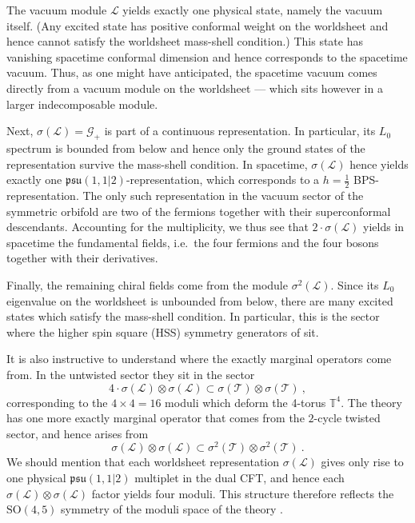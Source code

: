 \documentclass[12pt,a4paper]{article}
\newcommand{\be}{\begin{equation}}
\newcommand{\ee}{\end{equation}}
\begin{document}
The vacuum module $\mathscr{L}$ yields exactly one physical state, namely the vacuum itself. (Any excited state has positive conformal weight on the worldsheet and hence cannot satisfy the worldsheet mass-shell condition.) This state has vanishing spacetime conformal dimension and hence corresponds to the spacetime vacuum. Thus, as one might have anticipated, the spacetime vacuum comes directly from a vacuum module on the worldsheet --- which sits however in a larger indecomposable module. 

Next, $\sigma(\mathscr{L})=\mathscr{G}_+$ is part of a continuous representation. In particular, its $L_0$ spectrum is bounded from below and hence only the ground states of the representation survive the mass-shell condition. In spacetime, $\sigma(\mathscr{L})$ hence yields exactly one $\mathfrak{psu}(1,1|2)$-representation, which corresponds to a $h=\tfrac{1}{2}$ BPS-representation. The only such representation in the vacuum sector of the symmetric orbifold are two of the fermions together with their superconformal descendants. Accounting for the multiplicity, we thus see that $2 \cdot \sigma(\mathscr{L})$ yields in spacetime the fundamental fields, i.e.\ the four fermions and the four bosons together with their derivatives. 

Finally, the remaining chiral fields come from the module $\sigma^2(\mathscr{L})$. Since its $L_0$ eigenvalue on the worldsheet is unbounded from below, there are many excited states which satisfy the mass-shell condition. In particular, this is the sector where the higher spin square (HSS) symmetry generators of \cite{Gaberdiel:2014cha,Gaberdiel:2015mra} sit. 

It is also instructive to understand where the exactly marginal operators come from. In the untwisted sector they sit in the sector 
\be
4\cdot \sigma(\mathscr{L}) \otimes \sigma(\mathscr{L}) \subset \sigma(\mathscr{T}) \otimes \sigma(\mathscr{T}) \ , 
\ee
corresponding to the $4 \times 4=16$ moduli which deform the 4-torus $\mathbb{T}^4$. The theory has one more 
exactly marginal operator that comes from the $2$-cycle twisted sector, and hence arises from 
\be
\sigma(\mathscr{L}) \otimes \sigma(\mathscr{L}) \subset \sigma^2(\mathscr{T}) \otimes \sigma^2(\mathscr{T}) \ . 
\ee
We should mention that each worldsheet representation $\sigma(\mathscr{L})$ gives only rise to one physical $\mathfrak{psu}(1,1|2)$ multiplet in the dual CFT, and hence each $\sigma(\mathscr{L}) \otimes \sigma(\mathscr{L})$ factor yields four moduli. This structure therefore reflects the $\mathrm{SO}(4,5)$ symmetry of the moduli space of the theory \cite{Seiberg:1988pf}.
\end{document}
